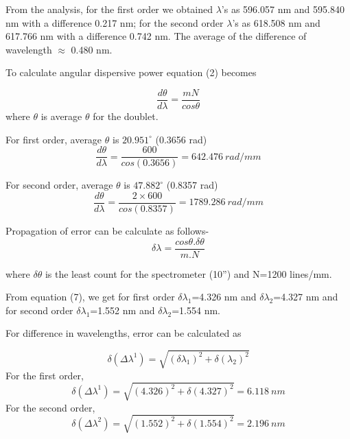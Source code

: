 \documentclass[a4paper, amsfonts, amssymb, amsmath, reprint, showkeys, nofootinbib, twoside]{revtex4-1}
\begin{document}
From the analysis, for the first order we obtained $\lambda$'s as 596.057 nm and 595.840 nm with a difference 0.217 nm; for the second order $\lambda$'s as 618.508 nm and 617.766 nm with a difference 0.742 nm. The average of the difference of wavelength $\approx$ 0.480 nm. 

To calculate angular dispersive power equation (2) becomes

\begin{equation}	\frac{d\theta}{d\lambda}=\frac{mN}{cos\theta}
\end{equation}
where $\theta$ is average $\theta$ for the doublet.

For first order, average $\theta$ is $20.951^{\circ} $ (0.3656 rad)
\begin{equation}	\frac{d\theta}{d\lambda}=\frac{600}{cos (0.3656)}=642.476 ~rad / mm
\end{equation}

For second order, average $\theta$ is $47.882^{\circ} $ (0.8357 rad)
\begin{equation}	\frac{d\theta}{d\lambda}=\frac{2\times600}{cos (0.8357)}= 1789.286~rad / mm
\end{equation}
	
Propagation of error can be calculate as follows-
\begin{equation}
	\delta \lambda=\frac{cos\theta. \delta \theta}{m.N}
\end{equation}

where $\delta \theta$ is the least count for the spectrometer (10'') and N=1200 lines/mm.

From equation (7), we get for first order $\delta \lambda_1$=4.326 nm and $\delta \lambda_2$=4.327 nm and for second order $\delta \lambda_1$=1.552 nm and $\delta \lambda_2$=1.554 nm.

For difference in wavelengths, error can be calculated as 

\begin{equation}
	\delta(\Delta \lambda^1)=\sqrt{(\delta \lambda_1)^2+\delta( \lambda_2)^2}
\end{equation}
 For the first order,
 \begin{equation}
	\delta(\Delta \lambda^1)=\sqrt{(4.326)^2+\delta(4.327)^2}=6.118~nm
 \end{equation}
 For the second order,
 \begin{equation}
	\delta(\Delta \lambda^2)=\sqrt{(1.552)^2+\delta(1.554)^2}=2.196~nm
\end{equation}
\end{document}

